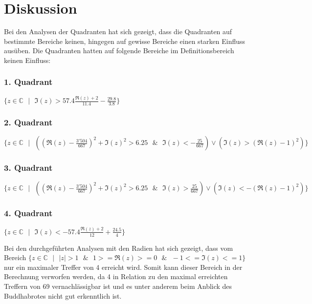 \section{Diskussion}
Bei den Analysen der Quadranten hat sich gezeigt, dass die Quadranten auf bestimmte Bereiche keinen, hingegen auf gewisse Bereiche einen starken Einfluss ausüben. Die Quadranten hatten auf folgende Bereiche im Definitionsbereich keinen Einfluss:
\begin{center}
\subsubsection*{1. Quadrant}
$\{z \in \mathbb{C}\text{ }|\text{ }\Im(z)>57.4\frac{\Re(z)+2}{11.4}-\frac{29.8}{3.8}\}$
\subsubsection*{2. Quadrant}
$\{z \in \mathbb{C}\text{ }|\text{ }((\Re(z)-\frac{3'504}{667})^2+\Im(z)^2>6.25 \text{ }\&\text{ } \Im(z) < -\frac{25}{667}) \lor (\Im(z)>(\Re(z)-1)^2) \}$
\subsubsection*{3. Quadrant}
$\{z \in \mathbb{C}\text{ }|\text{ }((\Re(z)-\frac{3'504}{667})^2+\Im(z)^2>6.25 \text{ }\&\text{ } \Im(z) > \frac{25}{667}) \lor (\Im(z)<-(\Re(z)-1)^2) \}$
\subsubsection*{4. Quadrant}
$\{z \in \mathbb{C}\text{ }|\text{ }\Im(z)<-57.4\frac{\Re(z)+2}{12}+\frac{24.5}{4}\}$\\
\end{center}
Bei den durchgeführten Analysen mit den Radien hat sich gezeigt, dass vom Bereich $\{z \in \mathbb{C}\text{ }|\text{ } |z| >1\text{ } \& \text{ } 1>=\Re(z)>=0 \text{ } \& \text{ }-1<=\Im(z)<=1\}$ nur ein maximaler Treffer von 4 erreicht wird. Somit kann dieser Bereich in der Berechnung verworfen werden, da 4 in Relation zu den maximal erreichten Treffern von 69 vernachlässigbar ist und es unter anderem beim Anblick des Buddhabrotes nicht gut erkenntlich ist.